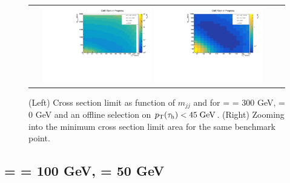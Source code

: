 \begin{figure}[tbh!]
	\centering
	\begin{tabular}{cc}
		\includegraphics[width=0.45\textwidth]{analysis/pics/JetInvMass_vs_MET_xsec_chi300_lsp000_taupt45.pdf}
		\includegraphics[width=0.45\textwidth]{analysis/pics/JetInvMass_vs_MET_xsec_chi300_lsp000_taupt45_zoom.pdf}
	\end{tabular}
	\caption{(Left) Cross section limit as function of $m_{jj}$ and \met for \charginopm = \neutralinotwo = 300 GeV, \neutralinoone = 0 GeV and an offline selection on $p_{\text{T}}(\tau_{\text{h}}) <  45\;\text{Ge}\kern-0.06667em\text{V}$. (Right) Zooming into the minimum cross section limit area for the same benchmark point.}
	\label{fig::JetInvMass_vs_MET_xsec_chi300_lsp000_taupt45}
\end{figure}

\FloatBarrier

\subsection*{\charginopm = \neutralinotwo = 100 GeV, \neutralinoone = 50 GeV}

\FloatBarrier


